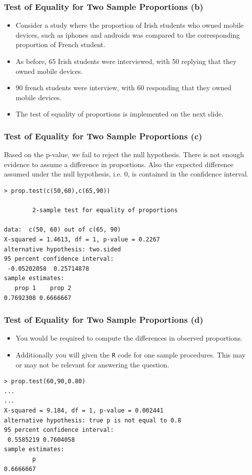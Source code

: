 \documentclass[a4]{beamer}
\begin{document}
\begin{frame}
\frametitle{Test of Equality for Two Sample Proportions (b)}
\begin{itemize}
\item Consider a study where the proportion of Irish students who owned mobile devices, such as iphones and androids was compared to the corresponding proportion of French student.
\item As before, $65$ Irish students were interviewed, with $50$ replying that they owned mobile devices.
\item $90$ french students were interview, with 60 responding that they owned mobile devices.
\item The test of equality of proportions is implemented on the next slide.
\end{itemize}
\end{frame}



\begin{frame}[fragile]
\frametitle{Test of Equality for Two Sample Proportions (c)}
Based on the p-value, we fail to reject the null hypothesis. There is not enough evidence to assume a difference in proportions. Also the expected difference assumed under the null hypothesis, i.e. 0, is contained in the confidence interval.
\begin{verbatim}
> prop.test(c(50,60),c(65,90))

        2-sample test for equality of proportions

data:  c(50, 60) out of c(65, 90)
X-squared = 1.4613, df = 1, p-value = 0.2267
alternative hypothesis: two.sided
95 percent confidence interval:
 -0.05202058  0.25714878
sample estimates:
   prop 1    prop 2
0.7692308 0.6666667
\end{verbatim}
\end{frame}
\begin{frame}[fragile]
\frametitle{Test of Equality for Two Sample Proportions (d)}
\begin{itemize}
\item You would be required to compute the differences in observed proportions.
\item Additionally you will given the \texttt{R} code for one sample procedures. This may or may not be relevant for answering the question.
\end{itemize}
\begin{verbatim}
> prop.test(60,90,0.80)
...
...
X-squared = 9.184, df = 1, p-value = 0.002441
alternative hypothesis: true p is not equal to 0.8
95 percent confidence interval:
 0.5585219 0.7604058
sample estimates:
        p
0.6666667
\end{verbatim}

\end{frame}
\end{document}
